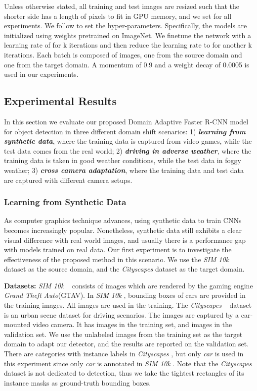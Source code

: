 \documentclass[10pt,twocolumn,letterpaper]{article}
\def\dim{\textit{SIM 10k} }
\def\cs{\textit{Cityscapes} }
\begin{document}
Unless otherwise stated, all training and test images are resized such that the shorter side has a length of  pixels to fit in GPU memory, and we set  for all experiments. We follow \cite{ren2015faster} to set the hyper-parameters. Specifically, the models are initialized using weights pretrained on ImageNet. We finetune the network with a learning rate of  for k iterations and then reduce the learning rate to  for another k iterations. Each batch is composed of  images, one from the source domain and one from the target domain. A momentum of 0.9 and a weight decay of 0.0005 is used in our experiments. 
\subsection{Experimental Results}
In this section we evaluate our proposed Domain Adaptive Faster R-CNN model for object detection in three different domain shift scenarios: 1) \textit{\textbf{learning from synthetic data}}, where the training data is captured from video games, while the test data comes from the real world; 2) \textit{\textbf{driving in adverse weather}}, where the training data is taken in good weather conditions, while the test data in foggy weather; 3) \textit{\textbf{cross camera adaptation}}, where the training data and test data are captured with different camera setups. 
\label{sec:experimental_results}
\subsubsection{Learning from Synthetic Data}
As computer graphics technique advances, using synthetic data to train CNNs becomes increasingly popular. Nonetheless, synthetic data still exhibits a clear visual difference with real world images, and usually there is a performance gap with models trained on real data. Our first experiment is to investigate the effectiveness of the proposed method in this scenario. We use the \dim~\cite{johnson2017driving} dataset as the source domain, and the \cs dataset as the target domain. 

\textbf{Datasets: } \dim~\cite{johnson2017driving} consists of  \mbox{images} which are rendered by the gaming engine \textit{Grand Theft Auto}(GTAV). In \dim, bounding boxes of  cars are provided in the  training images. All images are used in the training. The \cs~\cite{cordts2016cityscapes} dataset is an urban scene dataset for driving scenarios. The images are captured by a car-mounted video camera. It has  images in the training set, and  images in the validation set. We use the unlabeled images from the training set as the target domain to adapt our detector, and the results are reported on the validation set. There are  categories with instance labels in \cs, but only \textit{car} is used in this experiment since only \textit{car} is annotated in \dim. Note that the \cs dataset is not dedicated to detection, thus we take the tightest rectangles of its instance masks as ground-truth bounding boxes. 
\end{document}
